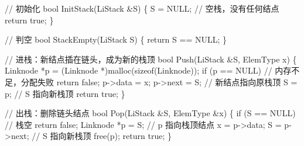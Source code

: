 \documentclass[10.5pt,a4paper,oneside]{article}
\newenvironment{Shaded}{}{}
\newcommand{\CommentTok}[1]{\textcolor[rgb]{0.18,0.55,0.23}{#1}}
\newcommand{\ControlFlowTok}[1]{\textcolor[rgb]{0.12,0.31,0.71}{#1}}
\newcommand{\DataTypeTok}[1]{\textcolor[rgb]{0.12,0.31,0.71}{#1}}
\newcommand{\KeywordTok}[1]{\textcolor[rgb]{0.12,0.31,0.71}{#1}}
\newcommand{\NormalTok}[1]{#1}
\newcommand{\OperatorTok}[1]{\textcolor[rgb]{0.20,0.20,0.20}{#1}}
\begin{document}
\begin{Shaded}
\begin{Highlighting}[]
\CommentTok{// 初始化}
\DataTypeTok{bool}\NormalTok{ InitStack}\OperatorTok{(}\NormalTok{LiStack }\OperatorTok{\&}\NormalTok{S}\OperatorTok{)} \OperatorTok{\{}
\NormalTok{    S }\OperatorTok{=}\NormalTok{ NULL}\OperatorTok{;}                       \CommentTok{// 空栈，没有任何结点}
    \ControlFlowTok{return} \KeywordTok{true}\OperatorTok{;}
\OperatorTok{\}}

\CommentTok{// 判空}
\DataTypeTok{bool}\NormalTok{ StackEmpty}\OperatorTok{(}\NormalTok{LiStack S}\OperatorTok{)} \OperatorTok{\{}
    \ControlFlowTok{return}\NormalTok{ S }\OperatorTok{==}\NormalTok{ NULL}\OperatorTok{;}
\OperatorTok{\}}

\CommentTok{// 进栈：新结点插在链头，成为新的栈顶}
\DataTypeTok{bool}\NormalTok{ Push}\OperatorTok{(}\NormalTok{LiStack }\OperatorTok{\&}\NormalTok{S}\OperatorTok{,}\NormalTok{ ElemType x}\OperatorTok{)} \OperatorTok{\{}
\NormalTok{    Linknode }\OperatorTok{*}\NormalTok{p }\OperatorTok{=} \OperatorTok{(}\NormalTok{Linknode }\OperatorTok{*)}\NormalTok{malloc}\OperatorTok{(}\KeywordTok{sizeof}\OperatorTok{(}\NormalTok{Linknode}\OperatorTok{));}
    \ControlFlowTok{if} \OperatorTok{(}\NormalTok{p }\OperatorTok{==}\NormalTok{ NULL}\OperatorTok{)}                  \CommentTok{// 内存不足，分配失败}
        \ControlFlowTok{return} \KeywordTok{false}\OperatorTok{;}
\NormalTok{    p}\OperatorTok{{-}\textgreater{}}\NormalTok{data }\OperatorTok{=}\NormalTok{ x}\OperatorTok{;}
\NormalTok{    p}\OperatorTok{{-}\textgreater{}}\NormalTok{next }\OperatorTok{=}\NormalTok{ S}\OperatorTok{;}                    \CommentTok{// 新结点指向原栈顶}
\NormalTok{    S }\OperatorTok{=}\NormalTok{ p}\OperatorTok{;}                          \CommentTok{// S 指向新栈顶}
    \ControlFlowTok{return} \KeywordTok{true}\OperatorTok{;}
\OperatorTok{\}}

\CommentTok{// 出栈：删除链头结点}
\DataTypeTok{bool}\NormalTok{ Pop}\OperatorTok{(}\NormalTok{LiStack }\OperatorTok{\&}\NormalTok{S}\OperatorTok{,}\NormalTok{ ElemType }\OperatorTok{\&}\NormalTok{x}\OperatorTok{)} \OperatorTok{\{}
    \ControlFlowTok{if} \OperatorTok{(}\NormalTok{S }\OperatorTok{==}\NormalTok{ NULL}\OperatorTok{)}                  \CommentTok{// 栈空}
        \ControlFlowTok{return} \KeywordTok{false}\OperatorTok{;}
\NormalTok{    Linknode }\OperatorTok{*}\NormalTok{p }\OperatorTok{=}\NormalTok{ S}\OperatorTok{;}                \CommentTok{// p 指向栈顶结点}
\NormalTok{    x }\OperatorTok{=}\NormalTok{ p}\OperatorTok{{-}\textgreater{}}\NormalTok{data}\OperatorTok{;}
\NormalTok{    S }\OperatorTok{=}\NormalTok{ p}\OperatorTok{{-}\textgreater{}}\NormalTok{next}\OperatorTok{;}                    \CommentTok{// S 指向新栈顶}
\NormalTok{    free}\OperatorTok{(}\NormalTok{p}\OperatorTok{);}
    \ControlFlowTok{return} \KeywordTok{true}\OperatorTok{;}
\OperatorTok{\}}


\end{Highlighting}
\end{Shaded}
\end{document}
